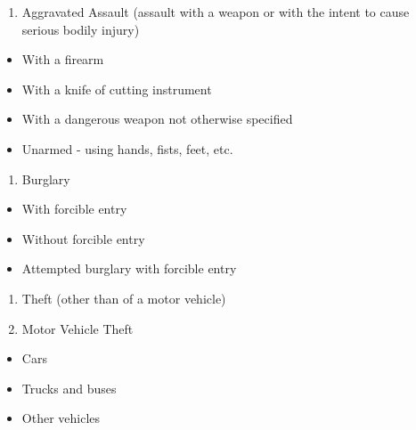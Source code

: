 \documentclass[
]{krantz}
\providecommand{\tightlist}{%
  \setlength{\itemsep}{0pt}\setlength{\parskip}{0pt}}
\begin{document}
\begin{enumerate}
\def\labelenumi{\arabic{enumi}.}
\setcounter{enumi}{3}
\tightlist
\item
  Aggravated Assault (assault with a weapon or with the
  intent to cause serious bodily injury)\\
\end{enumerate}

\begin{itemize}
\tightlist
\item
  With a firearm\\
\item
  With a knife of cutting instrument\\
\item
  With a dangerous weapon not otherwise specified\\
\item
  Unarmed - using hands, fists, feet, etc.\\
\end{itemize}

\begin{enumerate}
\def\labelenumi{\arabic{enumi}.}
\setcounter{enumi}{4}
\tightlist
\item
  Burglary\\
\end{enumerate}

\begin{itemize}
\tightlist
\item
  With forcible entry\\
\item
  Without forcible entry\\
\item
  Attempted burglary with forcible entry\\
\end{itemize}

\begin{enumerate}
\def\labelenumi{\arabic{enumi}.}
\setcounter{enumi}{5}
\tightlist
\item
  Theft (other than of a motor vehicle)\\
\item
  Motor Vehicle Theft\\
\end{enumerate}

\begin{itemize}
\tightlist
\item
  Cars\\
\item
  Trucks and buses\\
\item
  Other vehicles\\
\end{itemize}
\end{document}
